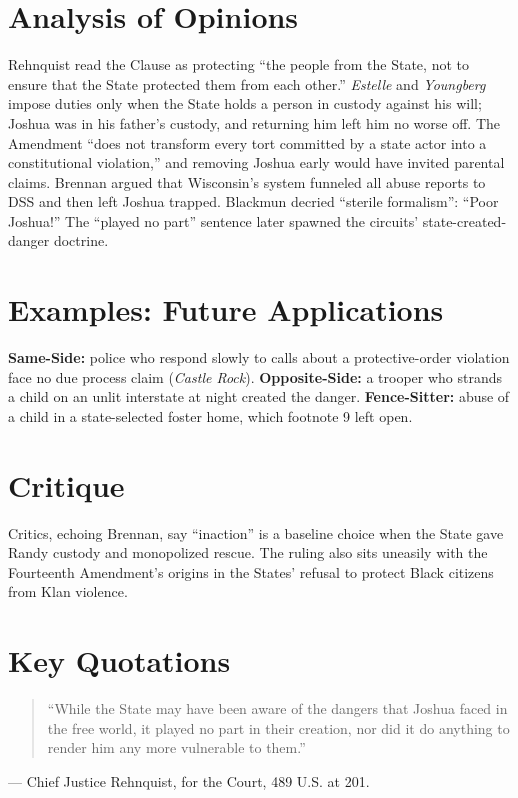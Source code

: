 \documentclass[12pt]{article}
\begin{document}
\section{Analysis of Opinions}
Rehnquist read the Clause as protecting ``the people from the State, not to ensure that the State protected them from each other.'' \textit{Estelle} and \textit{Youngberg} impose duties only when the State holds a person in custody against his will; Joshua was in his father's custody, and returning him left him no worse off. The Amendment ``does not transform every tort committed by a state actor into a constitutional violation,'' and removing Joshua early would have invited parental claims. Brennan argued that Wisconsin's system funneled all abuse reports to DSS and then left Joshua trapped. Blackmun decried ``sterile formalism'': ``Poor Joshua!'' The ``played no part'' sentence later spawned the circuits' state-created-danger doctrine.

\section{Examples: Future Applications}
\textbf{Same-Side:} police who respond slowly to calls about a protective-order violation face no due process claim (\textit{Castle Rock}). \textbf{Opposite-Side:} a trooper who strands a child on an unlit interstate at night created the danger. \textbf{Fence-Sitter:} abuse of a child in a state-selected foster home, which footnote 9 left open.

\section{Critique}
Critics, echoing Brennan, say ``inaction'' is a baseline choice when the State gave Randy custody and monopolized rescue. The ruling also sits uneasily with the Fourteenth Amendment's origins in the States' refusal to protect Black citizens from Klan violence.

\section{Key Quotations}
\begin{quote}
``While the State may have been aware of the dangers that Joshua faced in the free world, it played no part in their creation, nor did it do anything to render him any more vulnerable to them.''
\end{quote}
\noindent --- Chief Justice Rehnquist, for the Court, 489 U.S. at 201.
\end{document}
